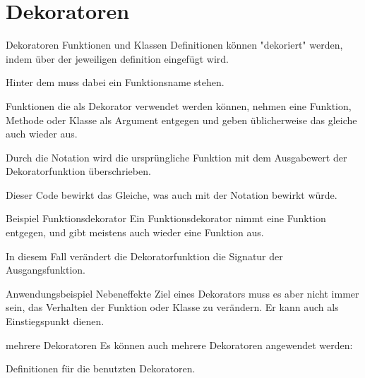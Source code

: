 \section{Dekoratoren}
\begin{frame}{Dekoratoren}
	Funktionen und Klassen Definitionen können "dekoriert" werden, indem über der jeweiligen definition  eingefügt wird.
	
	Hinter dem  muss dabei ein Funktionsname stehen.	
\end{frame}

\begin{frame}
	Funktionen die als Dekorator verwendet werden können, nehmen eine Funktion, Methode oder Klasse als Argument entgegen und geben üblicherweise das gleiche auch wieder aus. 
	
	Durch die  Notation wird die ursprüngliche Funktion mit dem Ausgabewert der Dekoratorfunktion überschrieben.
	
	Dieser Code bewirkt das Gleiche, was auch mit der  Notation bewirkt würde. 
\end{frame}

\begin{frame}{Beispiel Funktionsdekorator}
	Ein Funktionsdekorator nimmt eine Funktion entgegen, und gibt meistens auch wieder eine Funktion aus.
	
	
	In diesem Fall verändert die Dekoratorfunktion die Signatur der Ausgangsfunktion. 
\end{frame}

\begin{frame}{Anwendungsbeispiel Nebeneffekte}
	Ziel eines Dekorators muss es aber nicht immer sein, das Verhalten der Funktion oder Klasse zu verändern. Er kann auch als Einstiegspunkt dienen.
	
\end{frame}

\begin{frame}{mehrere Dekoratoren}
	Es können auch mehrere Dekoratoren angewendet werden:
	
\end{frame}

\begin{frame}
	Definitionen für die benutzten Dekoratoren.
	
\end{frame}

